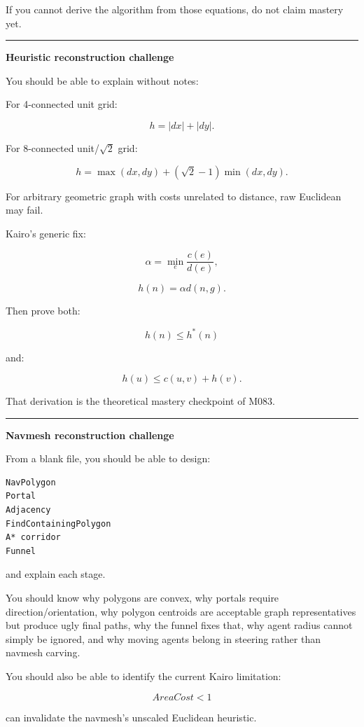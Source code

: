If you cannot derive the algorithm from those equations, do not claim mastery yet.

\begin{center}\rule{0.5\linewidth}{0.5pt}\end{center}

\textbf{Heuristic reconstruction challenge}

You should be able to explain without notes:

For 4-connected unit grid:

\[
h=
|dx|+|dy|.
\]

For 8-connected unit/\(\sqrt2\) grid:

\[
h=
\max(dx,dy)
+
(\sqrt2-1)\min(dx,dy).
\]

For arbitrary geometric graph with costs unrelated to distance, raw Euclidean may fail.

Kairo's generic fix:

\[
\alpha=
\min_e
\frac{c(e)}{d(e)},
\]

\[
h(n)=
\alpha d(n,g).
\]

Then prove both:

\[
h(n)\le h^*(n)
\]

and:

\[
h(u)\le c(u,v)+h(v).
\]

That derivation is the theoretical mastery checkpoint of M083.

\begin{center}\rule{0.5\linewidth}{0.5pt}\end{center}

\textbf{Navmesh reconstruction challenge}

From a blank file, you should be able to design:

\begin{verbatim}
NavPolygon
Portal
Adjacency
FindContainingPolygon
A* corridor
Funnel
\end{verbatim}

and explain each stage.

You should know why polygons are convex, why portals require direction/orientation, why polygon centroids are acceptable graph representatives but produce ugly final paths, why the funnel fixes that, why agent radius cannot simply be ignored, and why moving agents belong in steering rather than navmesh carving.

You should also be able to identify the current Kairo limitation:

\[
AreaCost<1
\]

can invalidate the navmesh's unscaled Euclidean heuristic.

